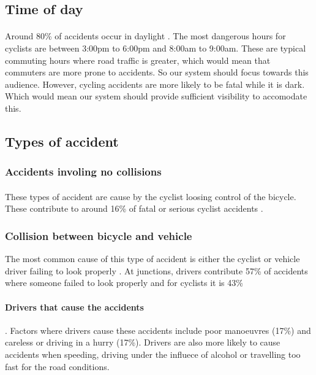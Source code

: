 \documentclass[a4paper]{report}
\begin{document}
{\subsection{Time of day}
\paragraph{}Around 80\% of accidents occur in daylight \citep{cycling_accidents}. The most dangerous hours for cyclists are between 3:00pm to 6:00pm and 8:00am to 9:00am. These are typical commuting hours where road traffic is greater, which would mean that commuters are more prone to accidents. So our system should focus towards this audience. However, cycling accidents are more likely to be fatal while it is dark. Which would mean our system should provide sufficient visibility to accomodate this.
\subsection{Types of accident}
\subsubsection{Accidents involing no collisions}
\paragraph{}These types of accident are cause by the cyclist loosing control of the bicycle. These contribute to around 16\% of fatal or serious cyclist accidents \citep{cycling_accidents}. 

\subsubsection{Collision between bicycle and vehicle}

The most common cause of this type of accident is either the cyclist or vehicle driver failing to look properly \citep{cycling_accidents}. At junctions, drivers contribute 57\% of accidents where someone failed to look properly and for cyclists it is 43\%

\paragraph{Drivers that cause the accidents}. Factors where drivers cause these accidents include poor manoeuvres (17\%) and careless or driving in a hurry (17\%). Drivers are also more likely to cause accidents when speeding, driving under the influece of alcohol or travelling too fast for the road conditions.

}
\end{document}

